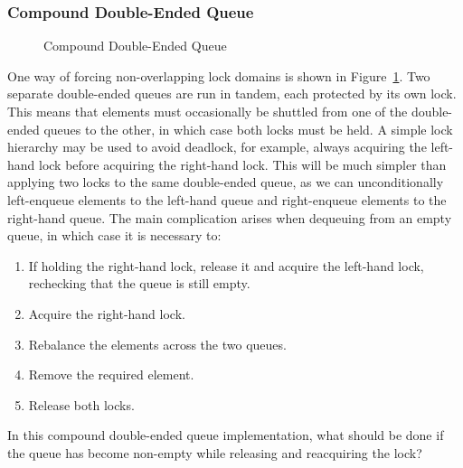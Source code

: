 \subsubsection{Compound Double-Ended Queue}
\label{sec:SMPdesign:Compound Double-Ended Queue}

\begin{figure}[tb]
\begin{center}
\end{center}
\caption{Compound Double-Ended Queue}
\label{fig:SMPdesign:Compound Double-Ended Queue}
\end{figure}

One way of forcing non-overlapping lock domains is shown in
Figure~\ref{fig:SMPdesign:Compound Double-Ended Queue}.
Two separate double-ended queues are run in tandem, each protected by
its own lock.
This means that elements must occasionally be shuttled from one of
the double-ended queues to the other, in which case both locks must
be held.
A simple lock hierarchy may be used to avoid deadlock, for example,
always acquiring the left-hand lock before acquiring the right-hand lock.
This will be much simpler than applying two locks to the same
double-ended queue, as we can unconditionally left-enqueue elements
to the left-hand queue and right-enqueue elements to the right-hand
queue.
The main complication arises when dequeuing from an empty queue, in
which case it is necessary to:

\begin{enumerate}
\item	If holding the right-hand lock, release it and acquire the
	left-hand lock, rechecking that the queue is still empty.
\item	Acquire the right-hand lock.
\item	Rebalance the elements across the two queues.
\item	Remove the required element.
\item	Release both locks.
\end{enumerate}

\QuickQuiz{}
	In this compound double-ended queue implementation, what should
	be done if the queue has become non-empty while releasing
	and reacquiring the lock?
 \QuickQuizEnd

